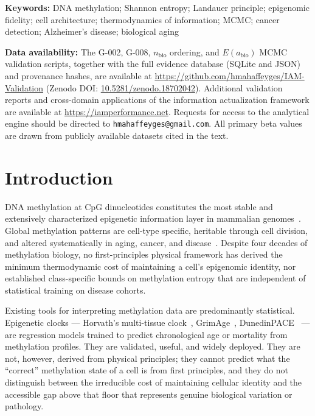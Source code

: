 \documentclass[12pt,a4paper]{article}
\begin{document}
\vspace{0.4cm}
\noindent\textbf{Keywords:} DNA methylation; Shannon entropy; Landauer principle;
epigenomic fidelity; cell architecture; thermodynamics of information; MCMC;
cancer detection; Alzheimer's disease; biological aging

\vspace{0.4cm}
{\small\noindent
\textbf{Data availability:} The G-002, G-008, $n_{\mathrm{bio}}$ ordering, and
$E(a_{\mathrm{bio}})$ MCMC validation scripts, together with the full evidence
database (SQLite and JSON) and provenance hashes, are available at
\url{https://github.com/hmahaffeyges/IAM-Validation}
(Zenodo DOI: \href{https://doi.org/10.5281/zenodo.18702042}{10.5281/zenodo.18702042}).
Additional validation reports and cross-domain applications of the information actualization
framework are available at \url{https://iamperformance.net}.
Requests for access to the analytical engine should be directed to \texttt{hmahaffeyges@gmail.com}.
All primary beta values are drawn from publicly available datasets cited in the text.}

\newpage
\tableofcontents
\newpage

\section{Introduction}
\label{sec:intro}

DNA methylation at CpG dinucleotides constitutes the most stable and
extensively characterized epigenetic information layer in mammalian
genomes~\cite{Bird2002,Jones2012}. Global methylation patterns are
cell-type specific, heritable through cell division, and altered systematically
in aging, cancer, and disease~\cite{Lister2009,Roadmap2015}. Despite four
decades of methylation biology, no first-principles physical framework has
derived the minimum thermodynamic cost of maintaining a cell's epigenomic
identity, nor established class-specific bounds on methylation entropy that
are independent of statistical training on disease cohorts.

Existing tools for interpreting methylation data are predominantly statistical.
Epigenetic clocks --- Horvath's multi-tissue clock~\cite{Horvath2013},
GrimAge~\cite{Lu2019}, DunedinPACE~\cite{Belsky2022} --- are regression
models trained to predict chronological age or mortality from methylation
profiles. They are validated, useful, and widely deployed. They are not,
however, derived from physical principles; they cannot predict what the
``correct'' methylation state of a cell is from first principles, and they
do not distinguish between the irreducible cost of maintaining cellular identity
and the accessible gap above that floor that represents genuine biological
variation or pathology.
\end{document}
